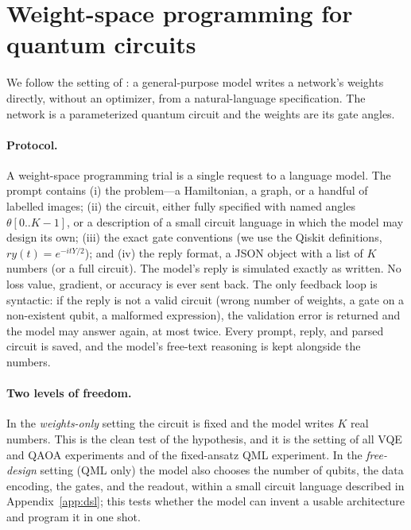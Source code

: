 \section{Weight-space programming for quantum circuits}
\label{sec:method}

We follow the setting of \citet{takehi2026sparks}: a general-purpose model writes a network's weights directly, without an optimizer, from a natural-language specification. The network is a parameterized quantum circuit and the weights are its gate angles.

\paragraph{Protocol.}
A weight-space programming trial is a single request to a language model. The prompt contains (i) the problem---a Hamiltonian, a graph, or a handful of labelled images; (ii) the circuit, either fully specified with named angles $\theta[0..K{-}1]$, or a description of a small circuit language in which the model may design its own; (iii) the exact gate conventions (we use the Qiskit definitions, \eg\ $ry(t) = e^{-itY/2}$); and (iv) the reply format, a JSON object with a list of $K$ numbers (or a full circuit). The model's reply is simulated exactly as written. No loss value, gradient, or accuracy is ever sent back. The only feedback loop is syntactic: if the reply is not a valid circuit (wrong number of weights, a gate on a non-existent qubit, a malformed expression), the validation error is returned and the model may answer again, at most twice. Every prompt, reply, and parsed circuit is saved, and the model's free-text reasoning is kept alongside the numbers.

\paragraph{Two levels of freedom.}
In the \emph{weights-only} setting the circuit is fixed and the model writes $K$ real numbers. This is the clean test of the hypothesis, and it is the setting of all VQE and QAOA experiments and of the fixed-ansatz QML experiment. In the \emph{free-design} setting (QML only) the model also chooses the number of qubits, the data encoding, the gates, and the readout, within a small circuit language described in Appendix~\ref{app:dsl}; this tests whether the model can invent a usable architecture and program it in one shot.

